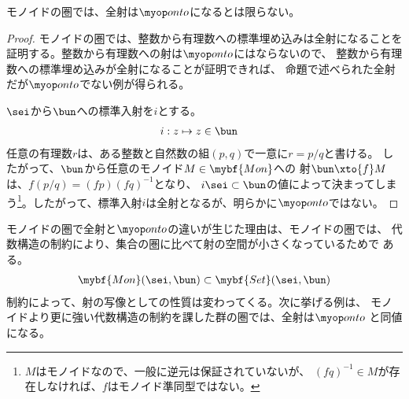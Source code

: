 	\begin{proposition}[モノイドの圏での上への写像]
	\label{prop:モノイドの圏での上への写像} %
		モノイドの圏では、全射は$\onto$になるとは限らない。
	\end{proposition} %
	\begin{proof} %
		モノイドの圏では、整数から有理数への標準埋め込みは全射になることを
		証明する。整数から有理数への射は$\onto$にはならないので、
		整数から有理数への標準埋め込みが全射になることが証明できれば、
		命題で述べられた全射だが$\onto$でない例が得られる。
		
		$\sei$から$\bun$への標準入射を$i$とする。
		\begin{equation*}\begin{split} %
			i:z &\mapsto z\in \bun
		\end{split}\end{equation*} %
		任意の有理数$r$は、ある整数と自然数の組$(p,q)$で一意に$r=p/q$と書ける。
		したがって、$\bun$から任意のモノイド$M\in\mybf{Mon}$への
		射$\bun\xto{f}M$は、$f(p/q)=(fp)(fq)^{-1}$となり、
		$i\sei\subset\bun$の値によって決まってしまう\footnote{
		$M$はモノイドなので、一般に逆元は保証されていないが、
		$(fq)^{-1}\in M$が存在しなければ、$f$はモノイド準同型ではない。
		}。したがって、標準入射$i$は全射となるが、明らかに$\onto$ではない。
	\end{proof} %

	モノイドの圏で全射と$\onto$の違いが生じた理由は、モノイドの圏では、
	代数構造の制約により、集合の圏に比べて射の空間が小さくなっているためで
	ある。
	\begin{equation*}\begin{split} %
		\mybf{Mon}(\sei,\bun) \subset \mybf{Set}(\sei,\bun)
	\end{split}\end{equation*} %
	制約によって、射の写像としての性質は変わってくる。次に挙げる例は、
	モノイドより更に強い代数構造の制約を課した群の圏では、全射は$\onto$
	と同値になる。


